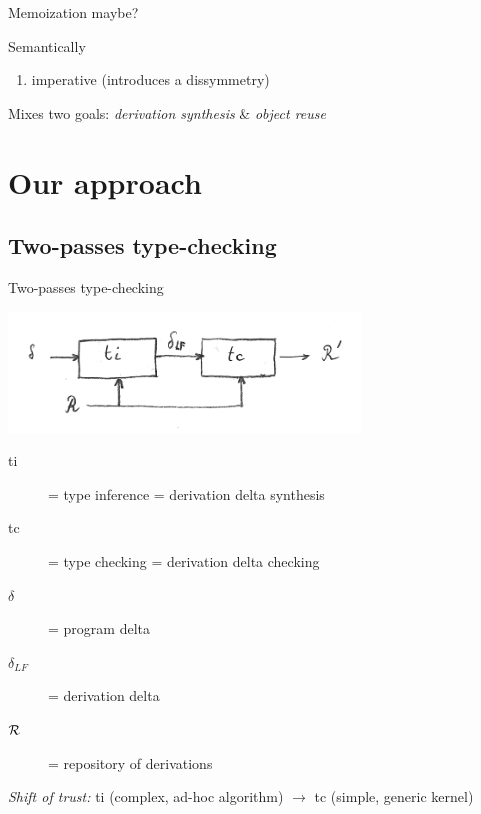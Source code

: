 \documentclass[ignorenonframetext,red]{beamer}
\begin{document}
\begin{frame}[fragile]{Memoization maybe?}
\begin{block}{Semantically}
\begin{enumerate}
{        
      }
      \pause
    \item[\itminus] imperative (introduces a dissymmetry)
    \end{enumerate}
  \end{block}
  \pause
  {\footnotesize Mixes two goals:} {\large \it derivation synthesis}
  {\footnotesize \&} {\large \it object reuse}
\end{frame}

\section{Our approach}

\subsection{Two-passes type-checking}

\begin{frame}{Two-passes type-checking}
  \begin{center}
    \includegraphics[width=0.7\textwidth]{images/tc-delta2.png}
  \end{center}
  \begin{description}
    \item[\textsf{ti}] = type inference = derivation delta synthesis
    \item[\textsf{tc}] = type checking = derivation delta checking
    \item[$\delta$] = program delta
    \item[$\delta_{LF}$] = derivation delta
    \item[$\mathcal{R}$] = repository of derivations
  \end{description}
  \vspace{1em}
  \pause
  \emph{Shift of trust:} \textsf{ti} (complex, ad-hoc algorithm) $\to$ \textsf{tc}
  (simple, generic kernel)
\end{frame}
\end{document}
